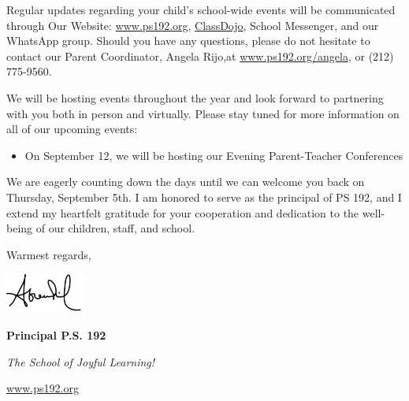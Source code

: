 \documentclass[12pt,letterpaper]{article}
\begin{document}
Regular updates regarding your child's school-wide events will be communicated through Our
Website: \url{www.ps192.org}, \href{https://www.classdojo.com/}{ClassDojo}, School Messenger, and our WhatsApp group. Should you have any questions, please do not hesitate to contact our Parent Coordinator, Angela Rijo,at \url{www.ps192.org/angela}, or (212) 775-9560.

We will be hosting events throughout the year and look forward to partnering with you both
in person and virtually. Please stay tuned for more information on all of our upcoming
events:
	\begin{itemize}
	\item On September 12, we will be hosting our Evening Parent-Teacher Conferences
	\end{itemize}
 
We are eagerly counting down the days until we can welcome you back on Thursday, September 5th. I am honored to serve as the principal of PS 192, and I extend my heartfelt gratitude
for your cooperation and dedication to the well-being of our children, staff, and school.

Warmest regards,

\includegraphics[width=0.2\textwidth]{hil_signature}

\textbf{Principal P.S. 192}

\textit{The School of Joyful Learning!}

\url{www.ps192.org}
\end{document}
